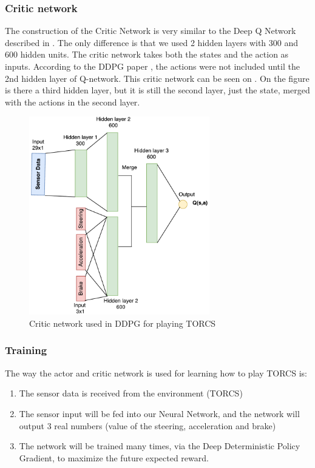 \subsubsection{Critic network}
The construction of the Critic Network is very similar to the Deep Q Network described in . The only difference is that we used 2 hidden layers with 300 and 600 hidden units. The critic network takes both the states and the action as inputs. According to the DDPG paper \cite{DBLP:journals/corr/LillicrapHPHETS15}, the actions were not included until the 2nd hidden layer of Q-network. This critic network can be seen on . On the figure is there a third hidden layer, but it is still the second layer, just the state, merged with the actions in the second layer.

\begin{figure}[H]
	\centering
	\includegraphics[width=0.7\textwidth]{Figures/Architecture/DDPG/DDPG_Critic_network.pdf}
	\caption{Critic network used in DDPG for playing TORCS }
	\label{fig:DDPG_Critic_network}
\end{figure}  

\subsubsection{Training}
The way the actor and critic network is used for learning how to play TORCS is: 
\begin{enumerate}
	\item The sensor data is received from the environment (TORCS) 
	\item The sensor input will be fed into our Neural Network, and the network will output 3 real numbers (value of the steering, acceleration and brake)
	\item The network will be trained many times, via the Deep Deterministic Policy Gradient, to maximize the future expected reward.
\end{enumerate}

